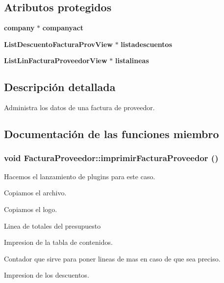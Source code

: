 \subsection*{Atributos protegidos}
\begin{CompactItemize}
\item 
{\bf company} $\ast$ {\bf companyact}\label{classFacturaProveedor_p0}

\item 
{\bf List\-Descuento\-Factura\-Prov\-View} $\ast$ {\bf listadescuentos}\label{classFacturaProveedor_p1}

\item 
{\bf List\-Lin\-Factura\-Proveedor\-View} $\ast$ {\bf listalineas}\label{classFacturaProveedor_p2}

\end{CompactItemize}


\subsection{Descripci\'{o}n detallada}
Administra los datos de una factura de proveedor. 



\subsection{Documentaci\'{o}n de las funciones miembro}
\subsubsection{\setlength{\rightskip}{0pt plus 5cm}void Factura\-Proveedor::imprimir\-Factura\-Proveedor ()\hspace{0.3cm}{\tt  [virtual]}}\label{classFacturaProveedor_a9}


Hacemos el lanzamiento de plugins para este caso.

Copiamos el archivo.

Copiamos el logo.

Linea de totales del presupuesto

Impresion de la tabla de contenidos.

Contador que sirve para poner lineas de mas en caso de que sea preciso.

Impresion de los descuentos.

